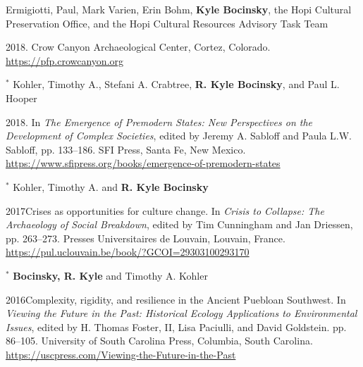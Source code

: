 Ermigiotti, Paul, Mark Varien, Erin Bohm, {\bf Kyle Bocinsky}, the Hopi Cultural Preservation Office, and the Hopi Cultural Resources Advisory Task Team 
\begin{list1}
\item[] 2018. Crow Canyon Archaeological Center, Cortez, Colorado.\\\href{https://pfp.crowcanyon.org}{https://pfp.crowcanyon.org}
\end{list1}

\newpage
$^\ast$ Kohler, Timothy A., Stefani A. Crabtree, {\bf R. Kyle Bocinsky}, and Paul L. Hooper 
\begin{list1}
\item[] 2018\hspace{.2cm}{Sociopolitical Evolution in Midrange Societies: The Prehispanic Pueblo Case}. In \emph{The Emergence of Premodern States: New Perspectives on the Development of Complex Societies}, edited by Jeremy A. Sabloff and Paula L.W. Sabloff, pp. 133–186. SFI Press, Santa Fe, New Mexico.\\\href{https://www.sfipress.org/books/emergence-of-premodern-states}{https://www.sfipress.org/books/emergence-of-premodern-states}
\end{list1}


$^\ast$ Kohler, Timothy A. and {\bf R. Kyle Bocinsky}
\begin{list1}
\item[] 2017\hspace{.2cm}Crises as opportunities for culture change. In \emph{Crisis to Collapse: The Archaeology of Social Breakdown}, edited by Tim Cunningham and Jan Driessen, pp. 263–273. Presses Universitaires de Louvain, Louvain, France.\\\href{https://pul.uclouvain.be/book/?GCOI=29303100293170}{https://pul.uclouvain.be/book/?GCOI=29303100293170}
\end{list1}

$^\ast$ {\bf Bocinsky, R. Kyle} and Timothy A. Kohler
\begin{list1}
\item[] 2016\hspace{.2cm}Complexity, rigidity, and resilience in the Ancient Puebloan Southwest. In \emph{Viewing the Future in the Past: Historical Ecology Applications to Environmental Issues}, edited by H. Thomas Foster, II, Lisa Paciulli, and David Goldstein. pp. 86–105. University of South Carolina Press, Columbia, South Carolina.\\\href{https://uscpress.com/Viewing-the-Future-in-the-Past}{https://uscpress.com/Viewing-the-Future-in-the-Past}
\end{list1}


